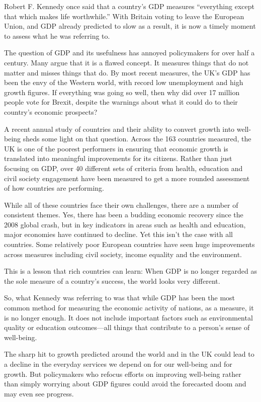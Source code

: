 Robert F. Kennedy once said that a country's GDP measures ``everything
except that which makes life worthwhile.'' With Britain voting to leave
the European Union, and GDP already predicted to slow as a result, it is
now a timely moment to assess what he was referring to.

The question of GDP and its usefulness has annoyed policymakers for
over half a century. Many argue that it is a flawed concept. It
measures things that do not matter and misses things that do. By most
recent measures, the UK's GDP has been the envy of the Western world,
with record low unemployment and high growth figures. If everything was
going so well, then why did over 17 million people vote for Brexit,
despite the warnings about what it could do to their country's economic
prospects?

A recent annual study of countries and their ability to convert growth
into well-being sheds some light on that question. Across the 163
countries measured, the UK is one of the poorest performers in ensuring
that economic growth is translated into meaningful improvements for its
citizens. Rather than just focusing on GDP, over 40 different sets of
criteria from health, education and civil society engagement have been
measured to get a more rounded assessment of how countries are
performing.

While all of these countries face their own challenges, there are a
number of consistent themes. Yes, there has been a budding economic
recovery since the 2008 global crash, but in key indicators in areas
such as health and education, major economies have continued to decline.
Yet this isn't the case with all countries. Some relatively poor
European countries have seen huge improvements across measures including
civil society, income equality and the environment.

This is a lesson that rich countries can learn: When GDP is no longer
regarded as the sole measure of a country's success, the world looks
very different.

So, what Kennedy was referring to was that while GDP has been the most
common method for measuring the economic activity of nations, as a
measure, it is no longer enough. It does not include important factors
such as environmental quality or education outcomes---all things that
contribute to a person's sense of well-being.

The sharp hit to growth predicted around the world and in the UK could
lead to a decline in the everyday services we depend on for our
well-being and for growth. But policymakers who refocus efforts on
improving well-being rather than simply worrying about GDP figures could
avoid the forecasted doom and may even see progress.


